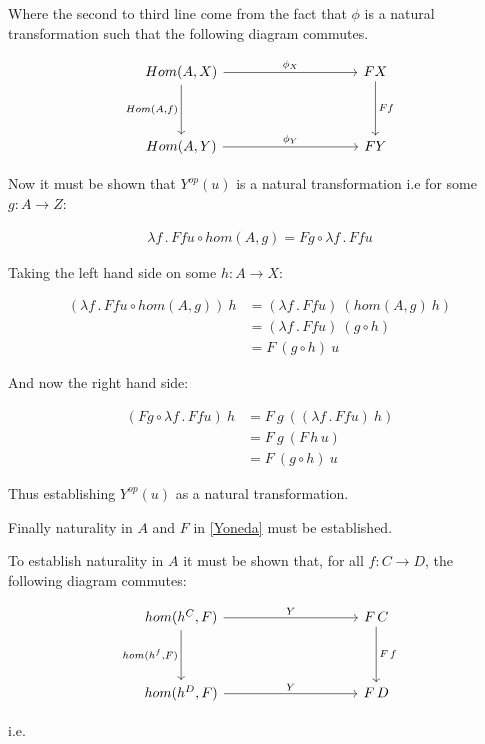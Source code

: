 \documentclass[a4paper,12pt]{article}
\begin{document}
Where the second to third line come from the fact that $\phi$ is a natural
transformation such that the following diagram commutes.

\[\begin{tikzcd}[sep=huge]
    {Hom(A, X)} \arrow[d, "{Hom(A,f)}"'] \arrow[rr, "\phi_{X}"] &  & FX
    \arrow[d, "Ff"] \\
    {Hom(A,Y)} \arrow[rr, "\phi_{Y}"] &  & FY
\end{tikzcd}\]

Now it must be shown that $Y^{op}(u)$ is a natural transformation i.e for some
$g: A \rightarrow Z$: 

\begin{align*}
    \lambda f \, . \, F f u  \circ hom(A, g) = F g \circ \lambda f \, . \, F f u
\end{align*}

Taking the left hand side on some $h: A \rightarrow X$:

\begin{align*}
    (\lambda f \, . \, F f u  \circ hom(A, g)) \ h &= (\lambda f \, . \, F f u) \ (
    hom(A, g) \ h) \\
    &= (\lambda f \, . \, F f u) \ (g \circ h) \\
    &=  F \ (g \circ h) \ u
\end{align*}

And now the right hand side:

\begin{align*}
    (F g \circ \lambda f \, . \, F f u) \ h &= F \ g \ ( (\lambda f \, . \, F f
        u) \
    h) \\
    &= F \ g \ (F \, h \, u) \\
    &= F \ (g \circ h) \ u
\end{align*}

Thus establishing $Y^{op}(u)$ as a natural transformation.

Finally naturality in $A$ and $F$ in \ref{Yoneda} must be established.

To establish naturality in $A$ it must be shown that, for all $f: C \rightarrow D$, the
following diagram commutes:

\[\begin{tikzcd}[sep=huge]
    {hom(h^C, F)} \arrow[d, "{hom(h^f, F)}"'] \arrow[rr, "Y"] &  & {F \,C}
    \arrow[d, "{F \, f}"] \\
    {hom(h^D, F)} \arrow[rr, "Y"] &  & {F \, D}
\end{tikzcd}\]

i.e.
\end{document}
